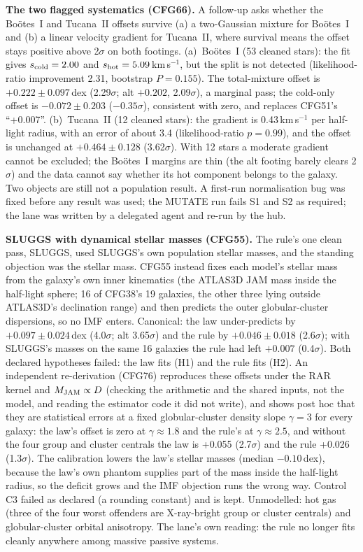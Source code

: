 \documentclass[10pt]{article}
\begin{document}
\textbf{The two flagged systematics (CFG66).} A follow-up asks whether the Bo\"otes~I and Tucana~II offsets survive (a) a two-Gaussian mixture for Bo\"otes~I and (b) a linear velocity gradient for Tucana~II, where survival means the offset stays positive above 2$\sigma$ on both footings. (a)~Bo\"otes~I (53 cleaned stars): the fit gives $s_{\rm cold}=2.00$ and $s_{\rm hot}=5.09$\,km\,s$^{-1}$, but the split is not detected (likelihood-ratio improvement 2.31, bootstrap $P=0.155$). The total-mixture offset is $+0.222\pm0.097$\,dex (2.29$\sigma$; alt $+0.202$, 2.09$\sigma$), a marginal pass; the cold-only offset is $-0.072\pm0.203$ ($-0.35\sigma$), consistent with zero, and replaces CFG51's ``+0.007''. (b)~Tucana~II (12 cleaned stars): the gradient is 0.43\,km\,s$^{-1}$ per half-light radius, with an error of about 3.4 (likelihood-ratio $p=0.99$), and the offset is unchanged at $+0.464\pm0.128$ (3.62$\sigma$). With 12 stars a moderate gradient cannot be excluded; the Bo\"otes~I margins are thin (the alt footing barely clears 2$\sigma$) and the data cannot say whether its hot component belongs to the galaxy. Two objects are still not a population result. A first-run normalisation bug was fixed before any result was used; the MUTATE run fails S1 and S2 as required; the lane was written by a delegated agent and re-run by the hub.

\textbf{SLUGGS with dynamical stellar masses (CFG55).} The rule's one clean pass, SLUGGS, used SLUGGS's own population stellar masses, and the standing objection was the stellar mass. CFG55 instead fixes each model's stellar mass from the galaxy's own inner kinematics (the ATLAS3D JAM mass inside the half-light sphere; 16 of CFG38's 19 galaxies, the other three lying outside ATLAS3D's declination range) and then predicts the outer globular-cluster dispersions, so no IMF enters. Canonical: the law under-predicts by $+0.097\pm0.024$\,dex (4.0$\sigma$; alt 3.65$\sigma$) and the rule by $+0.046\pm0.018$ (2.6$\sigma$); with SLUGGS's masses on the same 16 galaxies the rule had left $+0.007$ (0.4$\sigma$). Both declared hypotheses failed: the law fits (H1) and the rule fits (H2). An independent re-derivation (CFG76) reproduces these offsets under the RAR kernel and $M_{\rm JAM}\propto D$ (checking the arithmetic and the shared inputs, not the model, and reading the estimator code it did not write), and shows post hoc that they are statistical errors at a fixed globular-cluster density slope $\gamma=3$ for every galaxy: the law's offset is zero at $\gamma\approx1.8$ and the rule's at $\gamma\approx2.5$, and without the four group and cluster centrals the law is +0.055 (2.7$\sigma$) and the rule +0.026 (1.3$\sigma$). The calibration lowers the law's stellar masses (median $-0.10$\,dex), because the law's own phantom supplies part of the mass inside the half-light radius, so the deficit grows and the IMF objection runs the wrong way. Control C3 failed as declared (a rounding constant) and is kept. Unmodelled: hot gas (three of the four worst offenders are X-ray-bright group or cluster centrals) and globular-cluster orbital anisotropy. The lane's own reading: the rule no longer fits cleanly anywhere among massive passive systems.
\end{document}
